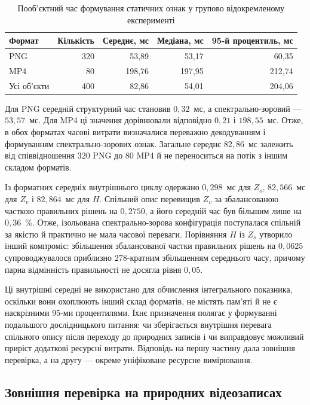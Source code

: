 \begin{table}[htbp]
\caption{Пооб’єктний час формування статичних ознак у групово відокремленому експерименті}
\label{tab:ch4_ind_svs_timing}
\centering
\small
\begin{tabular}{lrrrr}
\toprule
Формат & Кількість & Середнє, мс & Медіана, мс & 95-й процентиль, мс \\
\midrule
PNG & 320 & 53,89 & 53,17 & 60,35 \\
MP4 & 80 & 198,76 & 197,95 & 212,74 \\
\midrule
Усі об’єкти & 400 & 82,86 & 54,01 & 204,06 \\
\bottomrule
\end{tabular}
\end{table}

Для PNG середній структурний час становив $0{,}32$~мс, а спектрально-зоровий --- $53{,}57$~мс. Для MP4 ці значення дорівнювали відповідно $0{,}21$ і $198{,}55$~мс. Отже, в обох форматах часові витрати визначалися переважно декодуванням і формуванням спектрально-зорових ознак. Загальне середнє $82{,}86$~мс залежить від співвідношення $320$ PNG до $80$ MP4 й не переноситься на потік з іншим складом форматів.

Із форматних середніх внутрішнього циклу одержано $0{,}298$~мс для $Z_s$, $82{,}566$~мс для $Z_v$ і $82{,}864$~мс для $H$. Спільний опис перевищив $Z_v$ за збалансованою часткою правильних рішень на $0{,}2750$, а його середній час був більшим лише на $0{,}36$~\%. Отже, ізольована спектрально-зорова конфігурація поступалася спільній за якістю й практично не мала часової переваги. Порівняння $H$ із $Z_s$ утворило інший компроміс: збільшення збалансованої частки правильних рішень на $0{,}0625$ супроводжувалося приблизно $278$-кратним збільшенням середнього часу, причому парна відмінність правильності не досягла рівня $0{,}05$.

Ці внутрішні середні не використано для обчислення інтегрального показника, оскільки вони охоплюють інший склад форматів, не містять пам’яті й не є наскрізними 95-ми процентилями. Їхнє призначення полягає у формуванні подальшого дослідницького питання: чи зберігається внутрішня перевага спільного опису після переходу до природних записів і чи виправдовує можливий приріст додаткові ресурсні витрати. Відповідь на першу частину дала зовнішня перевірка, а на другу --- окреме уніфіковане ресурсне вимірювання.

\subsection{Зовнішня перевірка на природних відеозаписах}

